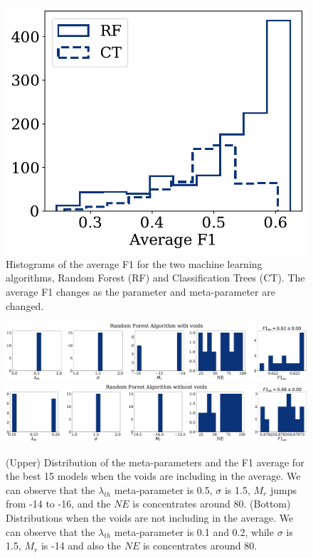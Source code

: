 \documentclass[usenatbib]{mnras}
\begin{document}
\begin{figure}
    \includegraphics[scale=0.55]{Figs/p_hist_f1.pdf}
    \caption{Histograms of the average F1 for the two machine
      learning algorithms, Random Forest (RF) and Classification Trees (CT).
      The average F1 changes as the parameter and meta-parameter are changed.}
    \label{fig:methods}
\end{figure}


\begin{figure}
\centering
    \includegraphics[scale=0.23]{Figs/p_features_Forest_F1_av.pdf}
    \includegraphics[scale=0.23]{Figs/p_features_Forest_F1_av_no_voids.pdf}
    \caption{(Upper) Distribution of the meta-parameters and the F1 average for the best 15 models when the voids are including in the average. We can observe that  the $\lambda_{th}$ meta-parameter is 0.5, $\sigma$ is 1.5, $M_r$ jumps from -14 to -16, and the $NE$ is concentrates around 80.
    (Bottom) Distributions when the voids are not including in the average. We can observe that the $\lambda_{th}$ meta-parameter is 0.1 and 0.2, while $\sigma$ is 1.5, $M_r$ is -14 and also the $NE$ is concentrates around 80.
      } 
    \label{fig:features_score}    
\end{figure}
\end{document}
